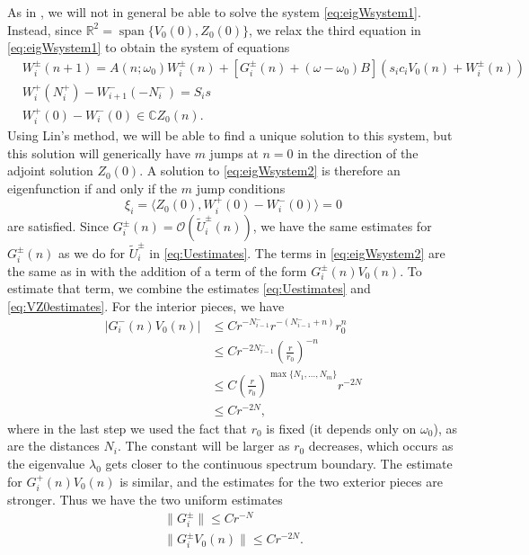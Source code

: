 \documentclass[12pt,reqno]{amsart}
\def\R{{\mathbb R}}
\def\C{{\mathbb C}}
\DeclareMathOperator{\spn}{span}
\begin{document}
As in \cites{Parker2020,Sandstede1998}, we will not in general be able to solve the system \cref{eq:eigWsystem1}. Instead, since $\R^2 = \spn\{ V_0(0), Z_0(0) \}$, we relax the third equation in \cref{eq:eigWsystem1} to obtain the system of equations
\begin{equation}\label{eq:eigWsystem2}
	\begin{aligned}
	& W_i^\pm(n+1)
	= A(n; \omega_0) W_i^\pm(n) + [G_i^\pm(n) + (\omega - \omega_0) B](s_i c_i V_0(n) + W_i^\pm(n))\\
	& W_i^+(N_i^+) - W_{i+1}^-(-N_i^-) = S_i s \\
	&W_i^+(0) - W_i^-(0) \in \C Z_0(n).
	\end{aligned}
\end{equation}
Using Lin's method, we will be able to find a unique solution to this system, but this solution will generically have $m$ jumps at $n = 0$ in the direction of the adjoint solution $Z_0(0)$. A solution to \cref{eq:eigWsystem2} is therefore an eigenfunction if and only if the $m$ jump conditions
\begin{equation}
	\xi_i = \langle Z_0(0), W_i^+(0) - W_i^-(0) \rangle = 0
\end{equation}
are satisfied. Since $G_i^\pm(n) = \mathcal{O}(\tilde{U}_i^\pm(n))$, we have the same estimates for $G_i^\pm(n)$ as we do for $\tilde{U}_i^\pm$ in \cref{eq:Uestimates}. The terms in \cref{eq:eigWsystem2} are the same as in \cite{Parker2020} with the addition of a term of the form $G_i^\pm(n) V_0(n)$. To estimate that term, we combine the estimates \cref{eq:Uestimates} and \cref{eq:VZ0estimates}. For the interior pieces, we have
\begin{align*}
| G_i^-(n) V_0(n) | &\leq C r^{-N_{i-1}^-} r^{-(N_{i-1}^- + n)} r_0^n \\
&\leq C r^{-2 N_{i-1}^-} \left(\frac{r}{r_0}\right)^{-n} \\
&\leq C \left(\frac{r}{r_0}\right)^{\max\{N_1, \dots, N_m\}} r^{-2 N} \\
&\leq C r^{-2 N} ,
\end{align*}
where in the last step we used the fact that $r_0$ is fixed (it depends only on $\omega_0$), as are the distances $N_i$. The constant will be larger as $r_0$ decreases, which occurs as the eigenvalue $\lambda_0$ gets closer to the continuous spectrum boundary. The estimate for $G_i^+(n) V_0(n)$ is similar, and the estimates for the two exterior pieces are stronger. Thus we have the two uniform estimates
\begin{equation}\label{eq:unifest}
	\begin{aligned}
		\|G_i^\pm\| \leq C r^{-N} \\
		\|G_i^\pm V_0(n) \| \leq C r^{-2 N}.
	\end{aligned}
\end{equation}
\end{document}

